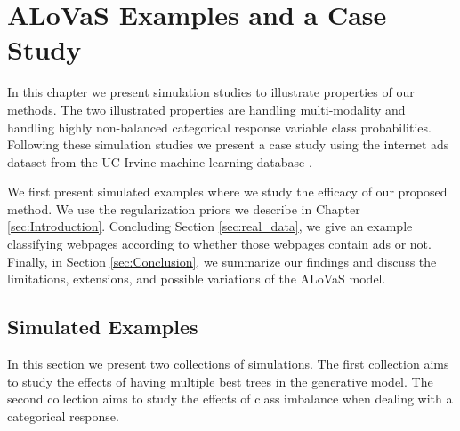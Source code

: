 \chapter{ALoVaS Examples and a Case Study}\label{sec:Examples}

In this chapter we present simulation studies to illustrate properties of our methods. The two illustrated properties are handling multi-modality and handling highly non-balanced categorical response variable class probabilities. Following these simulation studies we present a case study using the internet ads dataset from the UC-Irvine machine learning database \cite{Frank:2010uq}. 

We first present simulated examples where we study the efficacy of our proposed method. We use the regularization priors we describe in Chapter \ref{sec:Introduction}. Concluding Section \ref{sec:real_data}, we give an example classifying webpages according to whether those webpages contain ads or not. Finally, in Section \ref{sec:Conclusion}, we summarize our findings and discuss the limitations, extensions, and possible variations of the ALoVaS model.     

	\section{Simulated Examples}
	In this section we present two collections of simulations. The first collection aims to study the effects of having multiple best trees in the generative model. The second collection aims to study the effects of class imbalance when dealing with a categorical response. 
	
